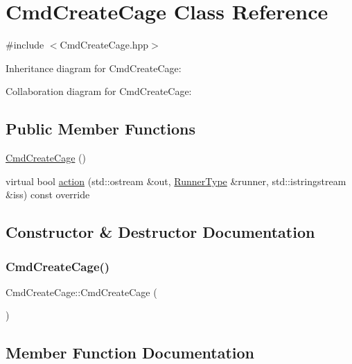 \hypertarget{classCmdCreateCage}{}\section{Cmd\+Create\+Cage Class Reference}
\label{classCmdCreateCage}


{\ttfamily \#include $<$Cmd\+Create\+Cage.\+hpp$>$}



Inheritance diagram for Cmd\+Create\+Cage\+:


Collaboration diagram for Cmd\+Create\+Cage\+:
\subsection*{Public Member Functions}
\begin{DoxyCompactItemize}
\item 
\hyperlink{classCmdCreateCage_a60d49db8d5301b8f7ec1e1ed9d67d24e}{Cmd\+Create\+Cage} ()
\item 
virtual bool \hyperlink{classCmdCreateCage_af8e324bc4a0a8b19fa68d0b57e3a28b6}{action} (std\+::ostream \&out, \hyperlink{Command_8hpp_a3594ceaf3c835811a9a67810e7af19f9}{Runner\+Type} \&runner, std\+::istringstream \&iss) const override
\end{DoxyCompactItemize}


\subsection{Constructor \& Destructor Documentation}
\mbox{\label{classCmdCreateCage_a60d49db8d5301b8f7ec1e1ed9d67d24e}} 
\subsubsection{\texorpdfstring{Cmd\+Create\+Cage()}{CmdCreateCage()}}
{\footnotesize\ttfamily Cmd\+Create\+Cage\+::\+Cmd\+Create\+Cage (\begin{DoxyParamCaption}{ }\end{DoxyParamCaption})}



\subsection{Member Function Documentation}
\mbox{\label{classCmdCreateCage_af8e324bc4a0a8b19fa68d0b57e3a28b6}} 
